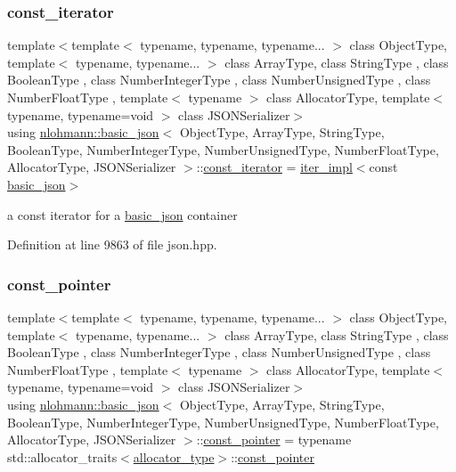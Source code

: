 \subsubsection{\texorpdfstring{const\+\_\+iterator}{const\_iterator}}
{\footnotesize\ttfamily template$<$template$<$ typename, typename, typename... $>$ class Object\+Type, template$<$ typename, typename... $>$ class Array\+Type, class String\+Type , class Boolean\+Type , class Number\+Integer\+Type , class Number\+Unsigned\+Type , class Number\+Float\+Type , template$<$ typename $>$ class Allocator\+Type, template$<$ typename, typename=void $>$ class J\+S\+O\+N\+Serializer$>$ \\
using \hyperlink{classnlohmann_1_1basic__json}{nlohmann\+::basic\+\_\+json}$<$ Object\+Type, Array\+Type, String\+Type, Boolean\+Type, Number\+Integer\+Type, Number\+Unsigned\+Type, Number\+Float\+Type, Allocator\+Type, J\+S\+O\+N\+Serializer $>$\+::\hyperlink{classnlohmann_1_1basic__json_a41a70cf9993951836d129bb1c2b3126a}{const\+\_\+iterator} =  \hyperlink{classnlohmann_1_1basic__json_abfd677a136936c16adf01e335f6a7a72}{iter\+\_\+impl}$<$const \hyperlink{classnlohmann_1_1basic__json}{basic\+\_\+json}$>$}



a const iterator for a \hyperlink{classnlohmann_1_1basic__json}{basic\+\_\+json} container 



Definition at line 9863 of file json.\+hpp.

\mbox{\label{classnlohmann_1_1basic__json_aff3d5cd2a75612364b888d8693231b58}} 
\subsubsection{\texorpdfstring{const\+\_\+pointer}{const\_pointer}}
{\footnotesize\ttfamily template$<$template$<$ typename, typename, typename... $>$ class Object\+Type, template$<$ typename, typename... $>$ class Array\+Type, class String\+Type , class Boolean\+Type , class Number\+Integer\+Type , class Number\+Unsigned\+Type , class Number\+Float\+Type , template$<$ typename $>$ class Allocator\+Type, template$<$ typename, typename=void $>$ class J\+S\+O\+N\+Serializer$>$ \\
using \hyperlink{classnlohmann_1_1basic__json}{nlohmann\+::basic\+\_\+json}$<$ Object\+Type, Array\+Type, String\+Type, Boolean\+Type, Number\+Integer\+Type, Number\+Unsigned\+Type, Number\+Float\+Type, Allocator\+Type, J\+S\+O\+N\+Serializer $>$\+::\hyperlink{classnlohmann_1_1basic__json_aff3d5cd2a75612364b888d8693231b58}{const\+\_\+pointer} =  typename std\+::allocator\+\_\+traits$<$\hyperlink{classnlohmann_1_1basic__json_a86ce930490cf7773b26f5ef49c04a350}{allocator\+\_\+type}$>$\+::\hyperlink{classnlohmann_1_1basic__json_aff3d5cd2a75612364b888d8693231b58}{const\+\_\+pointer}}



